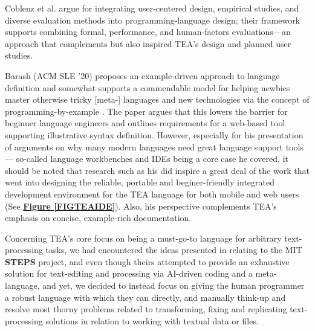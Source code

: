 \documentclass[sigplan,screen]{acmart}
\begin{document}
Coblenz et al. \cite{coblenz2018interdisciplinary} argue for integrating user‑centered design, empirical studies, and diverse evaluation methods into programming‑language design; their framework supports combining formal, performance, and human‑factors evaluations—an approach that complements but also inspired TEA’s design and planned user studies.


Barash (ACM SLE '20) \cite{barash2020exampledriven} proposes an example‑driven approach to language definition and somewhat supports a commendable model for helping newbies master otherwise tricky [meta-] languages and new technologies via the concept of programming-by-example \cite{yessenov2013colorful}. The paper argues that this lowers the barrier for beginner language engineers and outlines requirements for a web‑based tool supporting illustrative syntax definition. However, especially for his presentation of arguments on why many modern languages need great language support tools --- so-called language workbenches and IDEs being a core case he covered, it should be noted that research such as his did inspire a great deal of the work that went into designing the reliable, portable and beginer-friendly integrated development environment for the TEA language for both mobile and web users (See \textbf{\hyperref[FIGTEAIDE]{Figure \ref{FIGTEAIDE}}}). Also, his perspective complements TEA’s emphasis on concise, example‑rich documentation.

Concerning TEA's core focus on being a must-go-to language for arbitrary text-processing tasks, we had encountered the ideas presented in \cite{yessenov2013colorful} relating to the MIT \textbf{STEPS} project, and even though theirs attempted to provide an exhaustive solution for text-editing and processing via AI-driven coding and a meta-language, and yet, we decided to instead focus on giving the human programmer a robust language with which they can directly, and manually think-up and resolve most thorny problems related to transforming, fixing and replicating text-processing solutions in relation to working with textual data or files.
\end{document}
